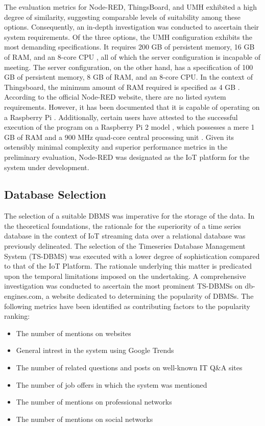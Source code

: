 {The evaluation metrics for Node-RED, ThingsBoard, and UMH exhibited a high degree of similarity, suggesting comparable levels of suitability among these options. Consequently, an in-depth investigation was conducted to ascertain their system requirements. Of the three options, the UMH configuration exhibits the most demanding specifications. It requires 200 GB of persistent memory, 16 GB of RAM, and an 8-core CPU \cite{UMHInstallationRequirements}, all of which the server configuration is incapable of meeting. The server configuration, on the other hand, has a specification of 100 GB of persistent memory, 8 GB of RAM, and an 8-core CPU. In the context of Thingsboard, the minimum amount of RAM required is specified as 4 GB \cite{thingsboardInstallingThingsBoardCE}. According to the official Node-RED website, there are no listed system requirements. However, it has been documented that it is capable of operating on a Raspberry Pi \cite{RunningNodeREDLocally}. Additionally, certain users have attested to the successful execution of the program on a Raspberry Pi 2 model \cite{NodeRedMinimun2020}, which possesses a mere 1 GB of RAM and a 900 MHz quad-core central processing unit  \cite{ltdBuyRaspberryPi}. Given its ostensibly minimal complexity and superior performance metrics in the preliminary evaluation, Node-RED was designated as the IoT platform for the system under development.

\subsection{Database Selection}
The selection of a suitable DBMS was imperative for the storage of the data. In the theoretical foundations, the rationale for the superiority of a time series database in the context of IoT streaming data over a relational database was previously delineated. The selection of the Timeseries Database Management System (TS-DBMS) was executed with a lower degree of sophistication compared to that of the IoT Platform. The rationale underlying this matter is predicated upon the temporal limitations imposed on the undertaking. A comprehensive investigation was conducted to ascertain the most prominent TS-DBMSs on db-engines.com, a website dedicated to determining the popularity of DBMSs. The following metrics have been identified as contributing factors to the popularity ranking:

\begin{itemize}
	\item The number of mentions on websites
	\item General intrest in the system using Google Trends
	\item The number of related questions and posts on well-known IT Q\&A sites
	\item The number of job offers in which the system was mentioned
	\item The number of mentions on professional networks
	\item The number of mentions on social networks
\end{itemize}

}
